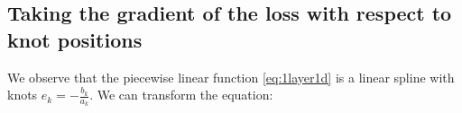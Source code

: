 




\subsection{Taking the gradient of the loss with respect to knot positions}

We observe that the piecewise linear function \ref{eq:1layer1d} is a linear spline with knots $e_k = -\frac{b_k}{a_k}$. We can transform the equation: 

